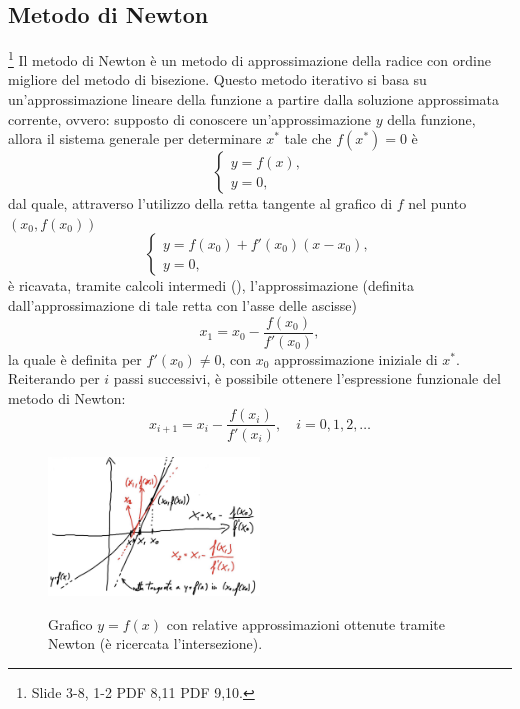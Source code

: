 \subsection{Metodo di Newton}\label{ssec:metodo_newton}
\footnote{Slide 3-8, 1-2 PDF 8,11 PDF 9,10.}
Il metodo di Newton è un metodo di approssimazione della radice con ordine migliore del metodo di bisezione. Questo metodo iterativo si basa su un'approssimazione lineare della funzione a partire dalla soluzione approssimata corrente, ovvero: supposto di conoscere un'approssimazione $y$ della funzione, allora il sistema generale per determinare $x^*$ tale che $f(x^*)=0$ è
\begin{equation*}
	\begin{cases}
		y = f(x),\\
		y = 0,
	\end{cases}
\end{equation*}
dal quale, attraverso l'utilizzo della retta tangente al grafico di $f$ nel punto $(x_0,f(x_0))$
\begin{equation}\label{eq:retta_tangente_in_0}
	\begin{cases}
		y = f(x_0) + f'(x_0)(x-x_0), \\
		y = 0,
	\end{cases}
\end{equation}
è ricavata, tramite calcoli intermedi (\footnotemark), l'approssimazione (definita dall'approssimazione di tale retta con l'asse delle ascisse)
\begin{equation*}
	x_1=x_0-\frac{f(x_0)}{f'(x_0)},
\end{equation*}
la quale è definita per $f'(x_0)\neq 0$, con $x_0$ approssimazione iniziale di $x^*$. Reiterando per $i$ passi successivi, è possibile ottenere l'espressione funzionale del metodo di Newton:
\begin{equation}\label{eq:approssimazione_newton}
	x_{i+1}=x_i-\frac{f(x_i)}{f'(x_i)}, \quad i=0,1,2,\hdots
\end{equation}


\begin{figure}
	\centering
	\includegraphics[width=0.5\textwidth]{immagini/GraficoRettaTangNewton.jpg}
	\label{fig:grafico_retta_tangente_metodo_newton}
	\caption{Grafico $y=f(x)$ con relative approssimazioni ottenute tramite Newton (è ricercata l'intersezione).}
\end{figure}

